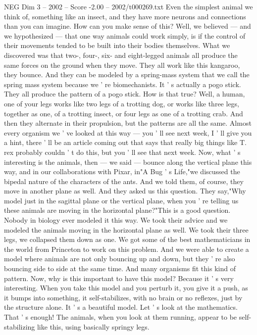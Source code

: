 \begin{textsample}{NEG Dim 3 – 2002 – Score -2.00 – 2002/t000269.txt}
Even the simplest animal we think of, something like an insect, and they have more neurons and connections than you can imagine.
How can you make sense of this?
Well, we believed — and we hypothesized — that one way animals could work simply, is if the control of their movements tended to be built into their bodies themselves.
What we discovered was that two-, four-, six- and eight-legged animals all produce the same forces on the ground when they move.
They all work like this kangaroo, they bounce.
And they can be modeled by a spring-mass system that we call the spring mass system because we ' re biomechanists.
It ' s actually a pogo stick.
They all produce the pattern of a pogo stick.
How is that true?
Well, a human, one of your legs works like two legs of a trotting dog, or works like three legs, together as one, of a trotting insect, or four legs as one of a trotting crab.
And then they alternate in their propulsion, but the patterns are all the same.
Almost every organism we ' ve looked at this way — you ' ll see next week, I ' ll give you a hint, there ' ll be an article coming out that says that really big things like T. rex probably couldn ' t do this, but you ' ll see that next week.
Now, what ' s interesting is the animals, then — we said — bounce along the vertical plane this way, and in our collaborations with Pixar, in"A Bug ' s Life,"we discussed the bipedal nature of the characters of the ants.
And we told them, of course, they move in another plane as well.
And they asked us this question.
They say,"Why model just in the sagittal plane or the vertical plane, when you ' re telling us these animals are moving in the horizontal plane?"This is a good question.
Nobody in biology ever modeled it this way.
We took their advice and we modeled the animals moving in the horizontal plane as well.
We took their three legs, we collapsed them down as one.
We got some of the best mathematicians in the world from Princeton to work on this problem.
And we were able to create a model where animals are not only bouncing up and down, but they ' re also bouncing side to side at the same time.
And many organisms fit this kind of pattern.
Now, why is this important to have this model?
Because it ' s very interesting.
When you take this model and you perturb it, you give it a push, as it bumps into something, it self-stabilizes, with no brain or no reflexes, just by the structure alone.
It ' s a beautiful model.
Let ' s look at the mathematics.
That ' s enough!
The animals, when you look at them running, appear to be self-stabilizing like this, using basically springy legs.

\end{textsample}
